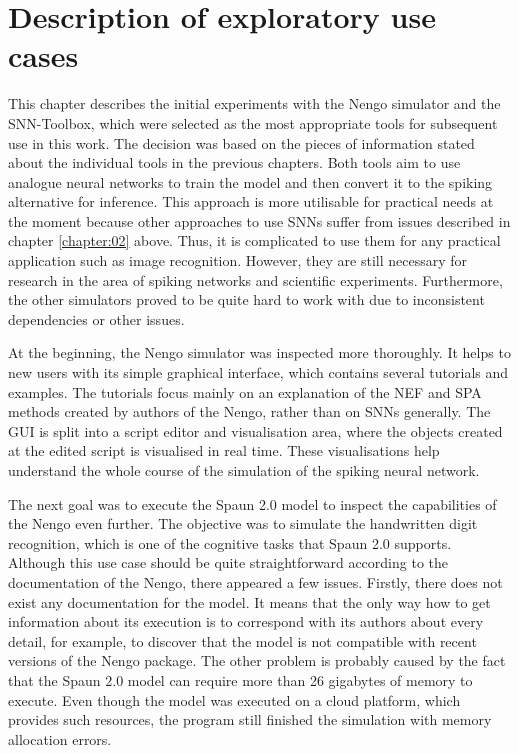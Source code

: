 \chapter{Description of exploratory use cases} \label{chapter:05}

This chapter describes the initial experiments with the Nengo simulator and the SNN-Toolbox, which were selected as the most appropriate tools for subsequent use in this work. The decision was based on the pieces of information stated about the individual tools in the previous chapters. Both tools aim to use analogue neural networks to train the model and then convert it to the spiking alternative for inference. This approach is more utilisable for practical needs at the moment because other approaches to use SNNs suffer from issues described in chapter \ref{chapter:02} above. Thus, it is complicated to use them for any practical application such as image recognition. However, they are still necessary for research in the area of spiking networks and scientific experiments. Furthermore, the other simulators proved to be quite hard to work with due to inconsistent dependencies or other issues. \par
At the beginning, the Nengo simulator was inspected more thoroughly. It helps to new users with its simple graphical interface, which contains several tutorials and examples. The tutorials focus mainly on an explanation of the NEF and SPA methods created by authors of the Nengo, rather than on SNNs generally. The GUI is split into a script editor and visualisation area, where the objects created at the edited script is visualised in real time. These visualisations help understand the whole course of the simulation of the spiking neural network. \par
The next goal was to execute the Spaun 2.0 model to inspect the capabilities of the Nengo even further. The objective was to simulate the handwritten digit recognition, which is one of the cognitive tasks that Spaun 2.0 supports. Although this use case should be quite straightforward according to the documentation of the Nengo, there appeared a few issues. Firstly, there does not exist any documentation for the model. It means that the only way how to get information about its execution is to correspond with its authors about every detail, for example, to discover that the model is not compatible with recent versions of the Nengo package. The other problem is probably caused by the fact that the Spaun 2.0 model can require more than 26 gigabytes of memory to execute. Even though the model was executed on a cloud platform, which provides such resources, the program still finished the simulation with memory allocation errors.

